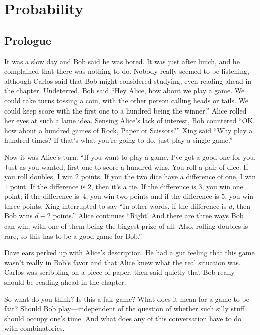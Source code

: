 \chapter{Probability}\label{ch:probability}

\section{Prologue}

It was a slow day and Bob said he was bored.  It was just
after lunch, and he complained that there was nothing to
do.  Nobody really seemed to be listening, although Carlos
said that Bob might considered studying, even reading ahead
in the chapter.  Undeterred, Bob said ``Hey Alice, how about
we play a game.  We could take turns tossing a coin, with
the other person calling heads or tails.  We could keep score
with the first one to a hundred being the winner.''  Alice
rolled her eyes at such a lame idea.  Sensing Alice's lack of
interest, Bob countered ``OK, how about a hundred games
of Rock, Paper or Scissors?''  Xing said ``Why play a hundred
times?  If that's what you're going to do, just play a single
game.''  

Now it was Alice's turn.  ``If you want to play
a game, I've got a good one for you.  Just as you wanted,
first one to score a hundred wins.  You roll a pair of
dice.  If you roll doubles, I win $2$ points.  If you the
two dice have a difference of one, I win $1$ point.  If the
difference is $2$, then it's a tie.  If the difference
is $3$, you win one point; if the difference is~$4$, you
win two points and if the difference is $5$, you win three points.  
Xing interrupted to say ``In other
words, if the difference is $d$, then Bob wins $d-2$ points.''
Alice continues ``Right!  And there are three
ways Bob can win, with one of them being the biggest prize of all.
Also, rolling doubles is rare, so this has to be a good game
for Bob.''

Dave ears perked up with Alice's description.  He had a gut
feeling that this game wasn't really in Bob's favor and that
Alice knew what the real situation was.  Carlos was scribbling
on a piece of paper, then said quietly that Bob really should be reading 
ahead in the chapter.

So what do you think?  Is this a fair game?  What does it mean
for a game to be fair?  Should Bob play---independent of the
question of whether such silly stuff should occupy one's time.
And what does any of this conversation have to do with
combinatorics.

